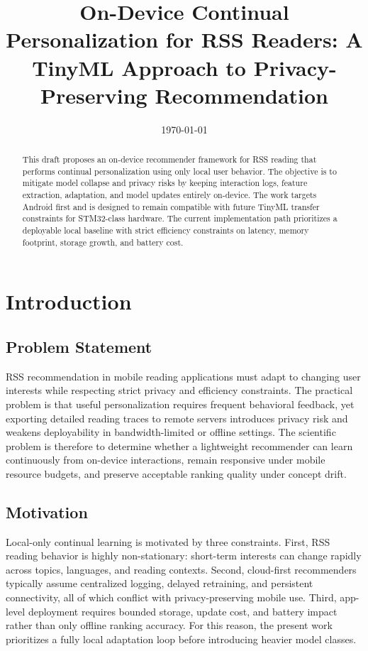 \documentclass[11pt]{article}
\title{On-Device Continual Personalization for RSS Readers: A TinyML Approach to Privacy-Preserving Recommendation}
\author{}
\date{\today}
\begin{document}
\maketitle

\begin{abstract}
This draft proposes an on-device recommender framework for RSS reading that performs continual personalization using only local user behavior. The objective is to mitigate model collapse and privacy risks by keeping interaction logs, feature extraction, adaptation, and model updates entirely on-device. The work targets Android first and is designed to remain compatible with future TinyML transfer constraints for STM32-class hardware. The current implementation path prioritizes a deployable local baseline with strict efficiency constraints on latency, memory footprint, storage growth, and battery cost.
\end{abstract}

\tableofcontents
\newpage

\section{Introduction}
\subsection{Problem Statement}
RSS recommendation in mobile reading applications must adapt to changing user interests while respecting strict privacy and efficiency constraints. The practical problem is that useful personalization requires frequent behavioral feedback, yet exporting detailed reading traces to remote servers introduces privacy risk and weakens deployability in bandwidth-limited or offline settings. The scientific problem is therefore to determine whether a lightweight recommender can learn continuously from on-device interactions, remain responsive under mobile resource budgets, and preserve acceptable ranking quality under concept drift.

\subsection{Motivation}
Local-only continual learning is motivated by three constraints. First, RSS reading behavior is highly non-stationary: short-term interests can change rapidly across topics, languages, and reading contexts. Second, cloud-first recommenders typically assume centralized logging, delayed retraining, and persistent connectivity, all of which conflict with privacy-preserving mobile use. Third, app-level deployment requires bounded storage, update cost, and battery impact rather than only offline ranking accuracy. For this reason, the present work prioritizes a fully local adaptation loop before introducing heavier model classes.
\end{document}
